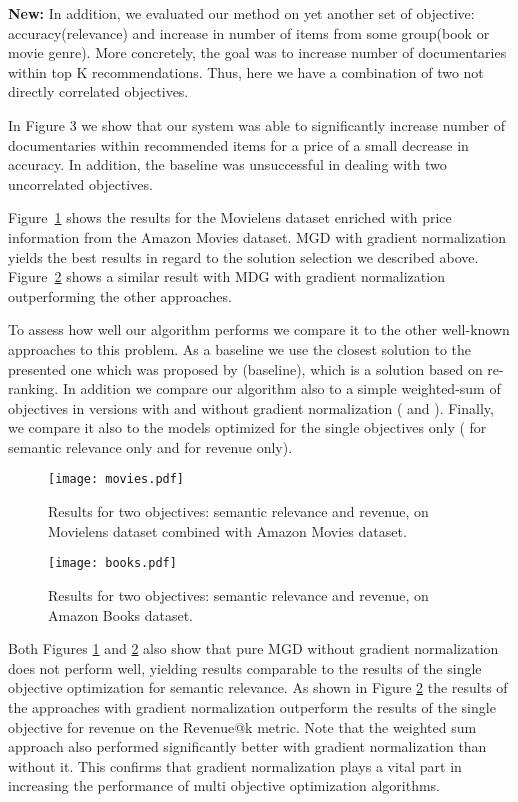 \documentclass[letterpaper]{article}
\begin{document}
{\textbf{New:} In addition, we evaluated our method on yet another set of objective: accuracy(relevance) and increase in number of items from some group(book or movie genre). More concretely, the goal was to increase number of documentaries within top K recommendations. Thus, here we have a combination of two not directly correlated objectives.

In Figure 3 we show that our system was able to significantly increase number of documentaries within recommended items for a price of a small decrease in accuracy. In addition, the baseline was unsuccessful in dealing with two uncorrelated objectives.}



Figure~\ref{fig:res-movies} shows the results for the Movielens dataset enriched with price information from the Amazon Movies dataset. MGD with gradient normalization yields the best results in regard to the solution selection we described above. Figure~\ref{fig:res-books} shows a similar result with MDG with gradient normalization outperforming the other approaches.

To assess how well our algorithm performs we compare it to the other well-known approaches to this problem. As a baseline we use the closest solution to the presented one which was proposed by \cite{Rodriguez:2012:MOO:2365952.2365961} (baseline), which is a solution based on re-ranking. In addition we compare our algorithm also to a simple weighted-sum of objectives in versions with and without gradient normalization ( and ). Finally, we compare it also to the models optimized for the single objectives only ( for semantic relevance only and  for revenue only).

\begin{figure}[!h]
    \centering
    \texttt{[image: movies.pdf]}
    \caption{\label{fig:res-movies}Results for two objectives: semantic relevance and revenue, on Movielens dataset combined with Amazon Movies dataset.}
\end{figure}

\begin{figure}[!h]
 \centering
    \texttt{[image: books.pdf]}
    \caption{\label{fig:res-books}Results for two objectives: semantic relevance and revenue, on Amazon Books dataset.}
\end{figure}

Both Figures \ref{fig:res-movies} and \ref{fig:res-books} also show that pure MGD without gradient normalization does not perform well, yielding results comparable to the results of the single objective optimization for semantic relevance.
As shown in Figure \ref{fig:res-books} the results of the approaches with gradient normalization outperform the results of the single objective for revenue on the Revenue@k metric. Note that the weighted sum approach also performed significantly better with gradient normalization than without it. This confirms that gradient normalization plays a vital part in increasing the performance of multi objective optimization algorithms. 
\end{document}
